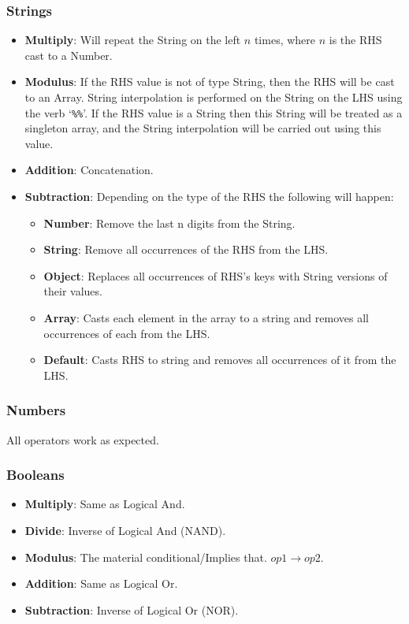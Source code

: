 \subsubsection{Strings}

\begin{itemize}
    \item \textbf{Multiply}: Will repeat the String on the left $n$ times, where $n$ is the RHS cast to a Number.
    \item \textbf{Modulus}: If the RHS value is not of type String, then the RHS will be cast to an Array. String interpolation is performed on the String on the LHS using the verb `\verb|%%|'. If the RHS value is a String then this String will be treated as a singleton array, and the String interpolation will be carried out using this value.
    \item \textbf{Addition}: Concatenation.
    \item \textbf{Subtraction}: Depending on the type of the RHS the following will happen:
    \begin{itemize}
        \item \textbf{Number}:  Remove the last n digits from the String.
        \item \textbf{String}:  Remove all occurrences of the RHS from the LHS.
        \item \textbf{Object}:  Replaces all occurrences of RHS's keys with String versions of their values.
        \item \textbf{Array}:   Casts each element in the array to a string and removes all occurrences of each from the LHS.
        \item \textbf{Default}: Casts RHS to string and removes all occurrences of it from the LHS.
    \end{itemize}
\end{itemize}

\subsubsection{Numbers}

All operators work as expected.

\subsubsection{Booleans}

\begin{itemize}
    \item \textbf{Multiply}: Same as Logical And.
    \item \textbf{Divide}: Inverse of Logical And (NAND).
    \item \textbf{Modulus}: The material conditional/Implies that. $op1 \rightarrow op2$.
    \item \textbf{Addition}: Same as Logical Or.
    \item \textbf{Subtraction}: Inverse of Logical Or (NOR).
\end{itemize}

